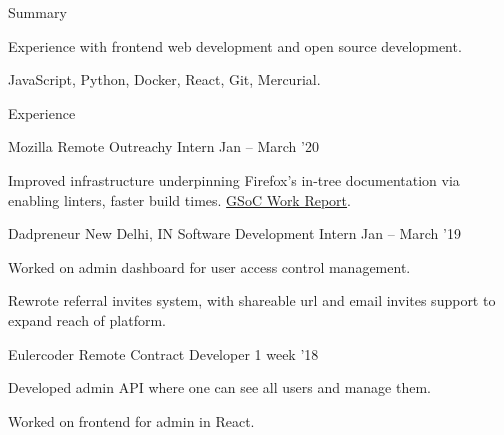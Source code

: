 \documentclass{resume} %
\begin{document}

\begin{rSection}{Summary}
  \begin{rSummarySection}
  {
    \item Experience with frontend web development and open source development.
    \item JavaScript, Python, Docker, React, Git, Mercurial.
  }
  \end{rSummarySection}
\end{rSection}


\begin{rSection}{Experience}
  \begin{rWorkSection}{Mozilla}
                      {Remote}
                      {Outreachy Intern}
                      {Jan -- March '20}
  {
    \item Improved infrastructure underpinning Firefox's in-tree documentation via enabling linters, faster build times. \href{http://bit.ly/GSoC19FF}{GSoC Work Report}.
  }
  \end{rWorkSection}

  \begin{rWorkSection}{Dadpreneur}
                     {New Delhi, IN}
                     {Software Development Intern}
                     {Jan -- March '19}
  {
    \item Worked on admin dashboard for user access control management.
    \item Rewrote referral invites system, with shareable url and email invites support to expand reach of platform.
  }
  \end{rWorkSection}

  \begin{rWorkSection}{Eulercoder}
                     {Remote}
                     {Contract Developer}
                     {1 week '18}
  {
    \item Developed admin API where one can see all users and manage them.
    \item Worked on frontend for admin in React.
  }
  \end{rWorkSection}
\end{rSection}
\end{document}
